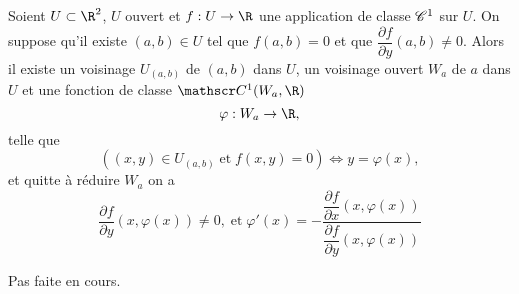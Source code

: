 \documentclass[class=report,crop=false]{standalone}
\begin{document}
%

\begin{proposition} 
\textcolor[rgb]{0.44,0.00,0.87}{ 
Soient $U \subset \R^2$, $U$ ouvert et $f:U \rightarrow \R$ une application
de classe $\mathscr{C}^1$ sur $U$. On suppose qu'il existe $(a,b) \in U$ tel que 
$f(a,b)=0$ et que $\dfrac{\partial f}{\partial y}(a,b) \neq 0$.
Alors il existe un voisinage $U_{(a,b)}$ de $(a,b)$ dans $U$, un voisinage
ouvert $W_a$ de $a$ dans $U$ et une fonction de classe $\co^1 (W_a, \R)$
\begin{equation*}
\varphi: W_a \rightarrow \R,
\end{equation*}
telle que
\begin{equation*}
((x,y) \in U_{(a,b)} \;\mathrm{et\;} f(x,y)=0)\Leftrightarrow y=\varphi(x),
\end{equation*}
et quitte à réduire $W_a$ on a 
\begin{equation*}
\dfrac{\partial f}{\partial y}(x,\varphi(x)) \neq 0, \; \mathrm{et \;}\varphi'(x)=-\dfrac{\dfrac{\partial f}{\partial x}(x,\varphi(x))}{\dfrac{\partial f}{\partial y}(x,\varphi(x))}
\end{equation*}
 }
\end{proposition}

 Pas faite en cours.
\end{document}
